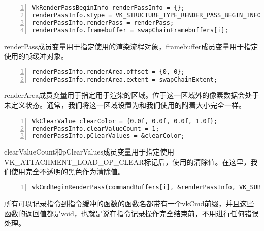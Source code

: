 \documentclass{ctexart}
\begin{document}
\begin{lstlisting}[language={[ANSI]C},keywordstyle=\color{blue!70},commentstyle=\color{red!50!green!50!blue!50},frame=shadowbox, rulesepcolor=\color{red!20!green!20!blue!20},basicstyle=\small,numbers=left, numberstyle=\tiny,breaklines=true]
VkRenderPassBeginInfo renderPassInfo = {};
renderPassInfo.sType = VK_STRUCTURE_TYPE_RENDER_PASS_BEGIN_INFO;
renderPassInfo.renderPass = renderPass;
renderPassInfo.framebuffer = swapChainFramebuffers[i];
\end{lstlisting}

renderPass成员变量用于指定使用的渲染流程对象，framebuffer成员变量用于指定使用的帧缓冲对象。

\begin{lstlisting}[language={[ANSI]C},keywordstyle=\color{blue!70},commentstyle=\color{red!50!green!50!blue!50},frame=shadowbox, rulesepcolor=\color{red!20!green!20!blue!20},basicstyle=\small,numbers=left, numberstyle=\tiny,breaklines=true]
renderPassInfo.renderArea.offset = {0, 0};
renderPassInfo.renderArea.extent = swapChainExtent;
\end{lstlisting}

renderArea成员变量用于指定用于渲染的区域。位于这一区域外的像素数据会处于未定义状态。通常，我们将这一区域设置为和我们使用的附着大小完全一样。

\begin{lstlisting}[language={[ANSI]C},keywordstyle=\color{blue!70},commentstyle=\color{red!50!green!50!blue!50},frame=shadowbox, rulesepcolor=\color{red!20!green!20!blue!20},basicstyle=\small,numbers=left, numberstyle=\tiny,breaklines=true]
VkClearValue clearColor = {0.0f, 0.0f, 0.0f, 1.0f};
renderPassInfo.clearValueCount = 1;
renderPassInfo.pClearValues = &clearColor;
\end{lstlisting}

clearValueCount和pClearValues成员变量用于指定使用VK\_ATTACHMENT\_LOAD\_OP\_CLEAR标记后，使用的清除值。在这里，我们使用完全不透明的黑色作为清除值。

\begin{lstlisting}[language={[ANSI]C},keywordstyle=\color{blue!70},commentstyle=\color{red!50!green!50!blue!50},frame=shadowbox, rulesepcolor=\color{red!20!green!20!blue!20},basicstyle=\small,numbers=left, numberstyle=\tiny,breaklines=true]
vkCmdBeginRenderPass(commandBuffers[i], &renderPassInfo, VK_SUBPASS_CONTENTS_INLINE);
\end{lstlisting}

所有可以记录指令到指令缓冲的函数的函数名都带有一个vkCmd前缀，并且这些函数的返回值都是void，也就是说在指令记录操作完全结束前，不用进行任何错误处理。
\end{document}
